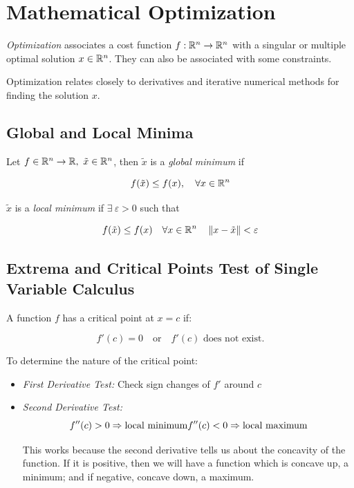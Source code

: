 \chapter{Mathematical Optimization}

\emph{Optimization} associates a cost function \(f:\mathbb{R}^n \to \mathbb{R}^n\) with a singular or multiple optimal 
solution \(x \in \mathbb{R}^n\). They can also be associated with some constraints.

Optimization relates closely to derivatives and iterative numerical methods for finding the solution \(x\).

\section{Global and Local Minima}

Let \(f \in \mathbb{R}^n \to \mathbb{R},\ \tilde{x} \in \mathbb{R}^n\), then \(\tilde{x}\) is a \emph{global minimum} if

\[
    f(\tilde{x}) \le f(x), \quad \forall x \in \mathbb{R}^n
\]

\(\tilde{x}\) is a \emph{local minimum} if \(\exists \ \varepsilon > 0\) such that 

\[
    f(\tilde{x}) \le f(x) \quad \forall x \in \mathbb{R}^n \quad \left\| x - \tilde{x} \right\| < \varepsilon
\]

\section{Extrema and Critical Points Test of Single Variable Calculus}

A function \(f\) has a critical point at \(x = c\) if:

\[
    f'(c) = 0 \quad \text{or} \quad f'(c) \text{ does not exist}.
\]

To determine the nature of the critical point:

\begin{itemize}

    \item \emph{First Derivative Test:} Check sign changes of \(f'\) around \(c\)

    \item \emph{Second Derivative Test:}
    \[
        f''(c) > 0 \Rightarrow \text{local minimum} \\
        f''(c) < 0 \Rightarrow \text{local maximum}
    \]

    This works because the second derivative tells us about the concavity of the function. If it is 
    positive, then we will have a function which is concave up, a minimum; and if negative, concave down, a maximum. 

\end{itemize}

